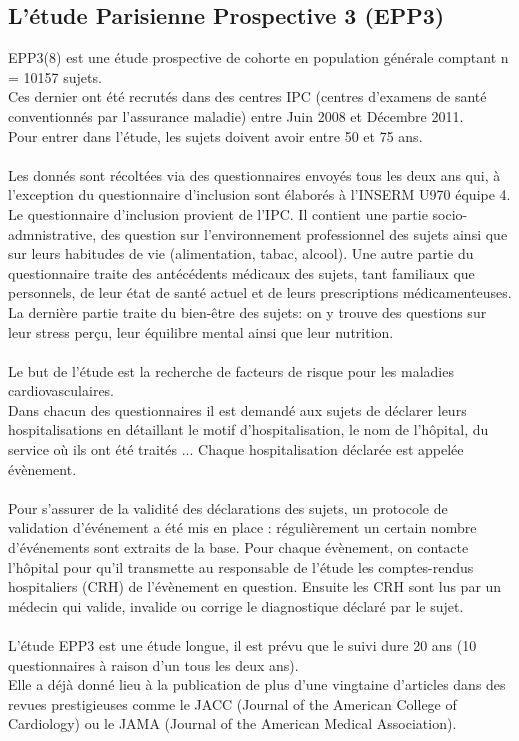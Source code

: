 \documentclass{book}
\begin{document}
\subsection{L'étude Parisienne Prospective 3 (EPP3)}
\noindent
EPP3(8) est une étude prospective de cohorte en population générale comptant n = 10157 sujets.\\
Ces dernier ont été recrutés dans des centres IPC (centres d'examens de santé conventionnés par l'assurance maladie) entre Juin 2008 et Décembre 2011.\\
Pour entrer dans l'étude, les sujets doivent avoir entre 50 et 75 ans.\\
\\
Les donnés sont récoltées via des questionnaires envoyés tous les deux ans qui, à l'exception du questionnaire d'inclusion sont élaborés à l'INSERM U970 équipe 4. \\
Le questionnaire d'inclusion provient de l'IPC. Il contient une partie socio-admnistrative, des question sur l'environnement professionnel des sujets ainsi que sur leurs habitudes de vie (alimentation, tabac, alcool). 
Une autre partie du questionnaire traite des antécédents médicaux des sujets, tant familiaux que personnels, de leur état de santé actuel et de leurs prescriptions médicamenteuses.
La dernière partie traite du bien-être des sujets: on y trouve des questions sur leur stress perçu, leur équilibre mental ainsi que leur nutrition.\\
\\
Le but de l'étude est la recherche de facteurs de risque pour les maladies cardiovasculaires.\\ 
Dans chacun des questionnaires il est demandé aux sujets de déclarer leurs hospitalisations en détaillant le motif d'hospitalisation, le nom de l'hôpital, du service où ils ont été traités ...
Chaque hospitalisation déclarée est appelée évènement.\\
\\
Pour s'assurer de la validité des déclarations des sujets, un protocole de validation d'événement a été mis en place : régulièrement un certain nombre d'événements sont extraits de la base. Pour chaque évènement, on contacte l'hôpital pour qu'il transmette au responsable de l'étude les comptes-rendus hospitaliers (CRH) de l'évènement en question. Ensuite les CRH sont lus par un médecin qui valide, invalide ou corrige le diagnostique déclaré par le sujet.\\
\\
L'étude EPP3 est une étude longue, il est prévu que le suivi dure 20 ans (10 questionnaires à raison d'un tous les deux ans).\\
Elle a déjà donné lieu à la publication de plus d'une vingtaine d'articles dans des revues prestigieuses comme le JACC (Journal of the American College of Cardiology) ou le JAMA (Journal of the American Medical Association).\\
\end{document}
